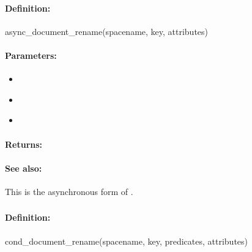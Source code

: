 \paragraph{Definition:}
\begin{rubycode}
async_document_rename(spacename, key, attributes)
\end{rubycode}

\paragraph{Parameters:}
\begin{itemize}[noitemsep]
\item {}\\

\item {}\\

\item {}\\

\end{itemize}

\paragraph{Returns:}


\paragraph{See also:}  This is the asynchronous form of .

\pagebreak
\subsubsection{}
\label{api:ruby:cond_document_rename}


\paragraph{Definition:}
\begin{rubycode}
cond_document_rename(spacename, key, predicates, attributes)
\end{rubycode}

